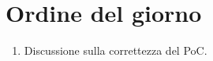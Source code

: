 \section{Ordine del giorno}

\begin{enumerate}
    \item Discussione sulla correttezza del PoC.
\end{enumerate}